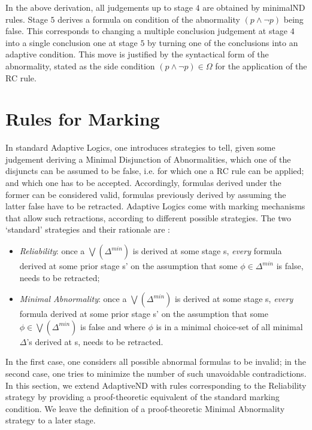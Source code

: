 \documentclass[]{article}
\begin{document}
In the above derivation, all judgements up to stage $4$ are obtained by {\sf minimalND} rules. Stage $5$ derives a formula on condition of the abnormality $(p\wedge \neg p)$ being false.  This corresponds to changing a multiple conclusion judgement at stage $4$ into a single conclusion one at stage $5$ by turning one of the conclusions into an adaptive condition. This move is justified by the syntactical form of the abnormality, stated as the side condition $(p \wedge \neg p)\in \Omega$ for the application of the {\sf RC} rule.



\section{Rules for Marking}\label{sec:marking}

In standard Adaptive Logics, one introduces strategies to tell, given some judgement deriving a  Minimal Disjunction of Abnormalities, which one of the disjuncts can be assumed to be false, i.e. for which one a {\sf RC} rule can be applied; and which one has to be accepted. Accordingly, formulas derived under the former can be considered valid, formulas previously derived by assuming the latter false have to be retracted. Adaptive Logics come with marking mechanisms that allow such retractions, according to different possible strategies. The two `standard' strategies and their rationale are \cite{batens01}:

\begin{itemize}
\item \textit{Reliability}: once a $\bigvee(\Delta^{min})$ is derived at some stage {\sf s}, \textit{every} formula derived at some prior stage {\sf s'} on the assumption that some $\phi\in \Delta^{min}$ is false, needs to be retracted;

\item \textit{Minimal Abnormality}: once a $\bigvee(\Delta^{min})$ is derived at some stage {\sf s}, \textit{every} formula derived at some prior stage {\sf s'} on the assumption that some $\phi\in \bigvee(\Delta^{min})$ is false and where $\phi$ is in a minimal choice-set of all minimal $\Delta$'s derived at \textsf{s}, needs to be retracted.
\end{itemize}
%
In the first case, one considers all possible abnormal formulas to be invalid; in the second case, one tries to minimize the number of such unavoidable contradictions. In this section, we extend {\sf AdaptiveND} with rules corresponding to the Reliability strategy by providing a proof-theoretic equivalent of the standard marking condition.
We leave the definition of a proof-theoretic Minimal Abnormality strategy to a later stage.
\end{document}
